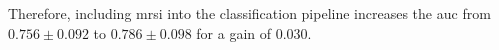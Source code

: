 \documentclass[a4paper,num-refs]{wiley-article}
\begin{document}
% 


Therefore, including \ac{mrsi} into the classification pipeline increases the \ac{auc} from $0.756 \pm 0.092$ to $0.786 \pm 0.098$ for a gain of $0.030$.






\end{document}
